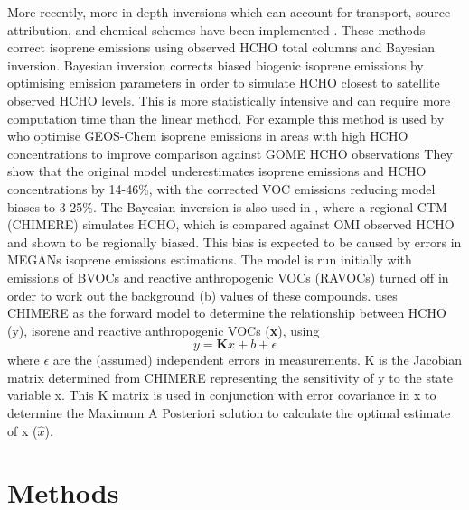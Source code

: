       More recently, more in-depth inversions which can account for transport, source attribution, and chemical schemes have been implemented \parencite{FortemsCheiney2012}.
      These methods correct isoprene emissions using observed HCHO total columns and Bayesian inversion.
      Bayesian inversion corrects biased biogenic isoprene emissions by optimising emission parameters in order to simulate HCHO closest to satellite observed HCHO levels.
      This is more statistically intensive and can require more computation time than the linear method.
      For example this method is used by \textcite{Shim2005} who optimise GEOS-Chem isoprene emissions in areas with high HCHO concentrations to improve comparison against GOME HCHO observations %
      They show that the original model underestimates isoprene emissions and HCHO concentrations by 14-46\%, with the corrected VOC emissions reducing model biases to 3-25\%.
      The Bayesian inversion is also used in \textcite{Curci2010}, where a regional CTM (CHIMERE) simulates HCHO, which is compared against OMI observed HCHO and shown to be regionally biased.
      This bias is expected to be caused by errors in MEGANs isoprene emissions estimations.
      The model is run initially with emissions of BVOCs and reactive anthropogenic VOCs (RAVOCs) turned off in order to work out the background (b) values of these compounds.
      \textcite{Curci2010} uses CHIMERE as the forward model to determine the relationship between HCHO (y), isorene and reactive anthropogenic VOCs (\textbf{x}), using 
      \begin{equation}
        y=\mathbf{K}x + b + \epsilon
      \end{equation}
      where $\epsilon$ are the (assumed) independent errors in measurements.
      K is the Jacobian matrix determined from CHIMERE representing the sensitivity of y to the state variable x.
      This K matrix is used in conjunction with error covariance in x to determine the Maximum A Posteriori solution to calculate the optimal estimate of x ($\hat{x}$).
    
  
  
\section{Methods}
  \label{BioIsop:Methods}
  

